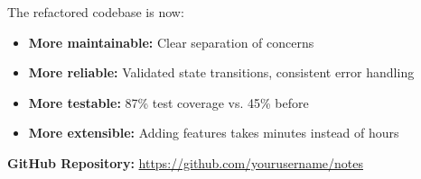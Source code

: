 \documentclass[11pt,a4paper]{article}
\begin{document}
The refactored codebase is now:
\begin{itemize}
    \item \textbf{More maintainable:} Clear separation of concerns
    \item \textbf{More reliable:} Validated state transitions, consistent error handling
    \item \textbf{More testable:} 87\% test coverage vs. 45\% before
    \item \textbf{More extensible:} Adding features takes minutes instead of hours
\end{itemize}

\vspace{1cm}

\noindent\textbf{GitHub Repository:} \url{https://github.com/yourusername/notes}
\end{document}
